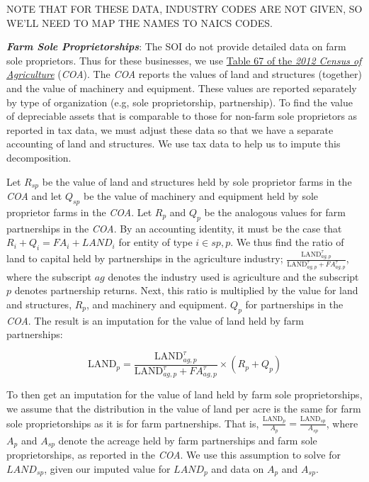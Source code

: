 \documentclass[article,11pt,letterpaper,fleqn]{article}
\theoremstyle{definition}
\numberwithin{equation}{section}
\begin{document}
NOTE THAT FOR THESE DATA, INDUSTRY CODES ARE NOT GIVEN, SO WE'LL NEED TO MAP THE NAMES TO NAICS CODES.

\textbf{\emph{Farm Sole Proprietorships}}:  The SOI do not provide detailed data on farm sole proprietors.  Thus for these businesses, we use \href{http://www.agcensus.usda.gov/Publications/2012/Full_Report/Volume_1,_Chapter_1_US/st99_1_067_067.pdf}{Table 67 of the \emph{2012 Census of Agriculture}} (\emph{COA}).  The \emph{COA} reports the values of land and structures (together) and the value of machinery and equipment.  These values are reported separately by type of organization (e.g, sole proprietorship, partnership).  To find the value of depreciable assets that is comparable to those for non-farm sole proprietors as reported in tax data, we must adjust these data so that we have a separate accounting of land and structures.  We use tax data to help us to impute this decomposition.  

Let $R_{sp}$ be the value of land and structures held by sole proprietor farms in the \emph{COA} and let $Q_{sp}$ be the value of machinery and equipment held by sole proprietor farms in the \emph{COA}.  Let $R_{p}$ and $Q_{p}$ be the analogous values for farm partnerships in the \emph{COA}.  By an accounting identity, it must be the case that $R_{i}+Q_{i}={FA}_{i}+{LAND}_{i}$ for entity of type $i\in{sp,p}$.  We thus find the ratio of land to capital held by partnerships in the agriculture industry; $\frac{\text{LAND}^{\tau}_{ag,p}}{{\text{LAND}^{\tau}_{ag,p}}+{FA}^{\tau}_{ag,p}}$, where the subscript $ag$ denotes the industry used is agriculture and the subscript $p$ denotes partnership returns. Next, this ratio is multiplied by the value for land and structures, $R_{p}$, and machinery and equipment. $Q_{p}$ for partnerships in the \emph{COA}.  The result is an imputation for the value of land held by farm partnerships: 

\begin{equation}
\text{LAND}_{p}= \frac{\text{LAND}^{\tau}_{ag,p}}{\text{LAND}^{\tau}_{ag,p}+{FA}^{\tau}_{ag,p}}\times (R_{p}+Q_{p})
\end{equation}

To then get an imputation for the value of land held by farm sole proprietorships, we assume that the distribution in the value of land per acre is the same for farm sole proprietorships as it is for farm partnerships.  That is, $\frac{\text{LAND}_{p}}{A_{p}}=\frac{\text{LAND}_{sp}}{A_{sp}}$, where $A_{p}$ and $A_{sp}$ denote the acreage held by farm partnerships and farm sole proprietorships, as reported in the \emph{COA}.  We use this assumption to solve for ${LAND}_{sp}$, given our imputed value for ${LAND}_{p}$ and data on $A_{p}$ and ${A}_{sp}$.  
\end{document}
